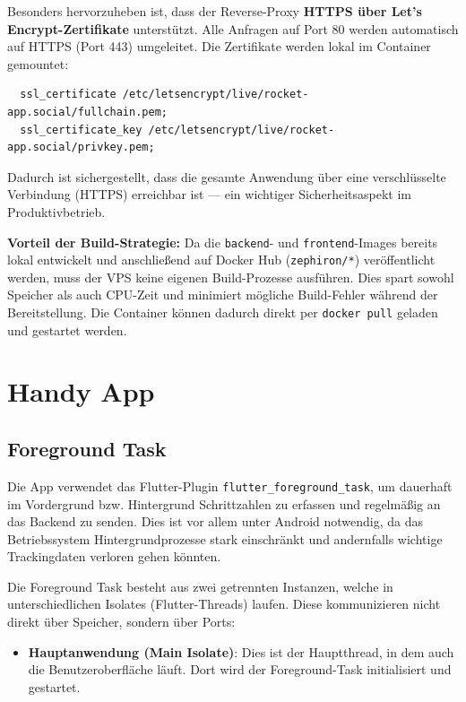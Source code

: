 \documentclass[11pt,a4paper]{article}
\begin{document}
\begin{itemize}
  Besonders hervorzuheben ist, dass der Reverse-Proxy \textbf{HTTPS über Let's Encrypt-Zertifikate} unterstützt. Alle Anfragen auf Port 80 werden automatisch auf HTTPS (Port 443) umgeleitet. Die Zertifikate werden lokal im Container gemountet:

  \begin{lstlisting}
  ssl_certificate /etc/letsencrypt/live/rocket-app.social/fullchain.pem;
  ssl_certificate_key /etc/letsencrypt/live/rocket-app.social/privkey.pem;
  \end{lstlisting}

  Dadurch ist sichergestellt, dass die gesamte Anwendung über eine verschlüsselte Verbindung (HTTPS) erreichbar ist — ein wichtiger Sicherheitsaspekt im Produktivbetrieb.
\end{itemize}

\vspace{1em}

\textbf{Vorteil der Build-Strategie:}
Da die \texttt{backend}- und \texttt{frontend}-Images bereits lokal entwickelt und anschließend auf Docker Hub (\texttt{zephiron/*}) veröffentlicht werden, muss der VPS keine eigenen Build-Prozesse ausführen. Dies spart sowohl Speicher als auch CPU-Zeit und minimiert mögliche Build-Fehler während der Bereitstellung. Die Container können dadurch direkt per \texttt{docker pull} geladen und gestartet werden.


\section{Handy App}
\subsection{Foreground Task}

Die App verwendet das Flutter-Plugin \texttt{flutter\_foreground\_task}\cite{flutter_foreground_task}, um dauerhaft im Vordergrund bzw. Hintergrund Schrittzahlen zu erfassen und regelmäßig an das Backend zu senden. Dies ist vor allem unter Android notwendig, da das Betriebssystem Hintergrundprozesse stark einschränkt und andernfalls wichtige Trackingdaten verloren gehen könnten.

Die Foreground Task besteht aus zwei getrennten Instanzen, welche in unterschiedlichen Isolates (Flutter-Threads) laufen. Diese kommunizieren nicht direkt über Speicher, sondern über Ports:

\begin{itemize}[leftmargin=1.5em]
    \item \textbf{Hauptanwendung (Main Isolate)}: Dies ist der Hauptthread, in dem auch die Benutzeroberfläche läuft. Dort wird der Foreground-Task initialisiert und gestartet.
\end{itemize}
\end{document}
